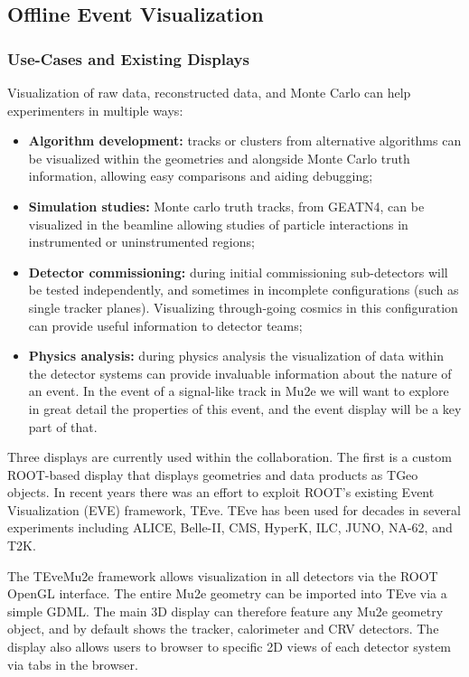 \subsection{Offline Event Visualization}

\subsubsection{Use-Cases and Existing Displays}
Visualization of raw data, reconstructed data, and Monte Carlo can help experimenters in multiple ways:
\begin{itemize}
    \item \textbf{Algorithm development:} tracks or clusters from alternative algorithms can be visualized within the geometries and alongside Monte Carlo truth information, allowing easy comparisons and aiding debugging;
    \item \textbf{Simulation studies:} Monte carlo truth tracks, from GEATN4, can be visualized in the beamline allowing studies of particle interactions in instrumented or uninstrumented regions;
    \item \textbf{Detector commissioning:} during initial commissioning sub-detectors will be tested independently, and sometimes in incomplete configurations (such as single tracker planes). Visualizing through-going cosmics in this configuration can provide useful information to detector teams;
    \item \textbf{Physics analysis:} during physics analysis the visualization of data within the detector systems can provide invaluable information about the nature of an event. In the event of a signal-like track in Mu2e we will want to explore in great detail the properties of this event, and the event display will be a key part of that.
\end{itemize}

 Three displays are currently used within the collaboration. The first is a custom ROOT-based display that displays geometries and data products as TGeo objects. In recent years there was an effort to exploit ROOT's existing Event Visualization (EVE) framework, TEve. TEve has been used for decades in several experiments including ALICE, Belle-II, CMS, HyperK, ILC, JUNO, NA-62, and T2K. 
 
 The TEveMu2e framework allows visualization in all detectors via the ROOT OpenGL interface. The entire Mu2e geometry can be imported into TEve via a simple GDML. The main 3D display can therefore feature any Mu2e geometry object, and by default shows the tracker, calorimeter and CRV detectors. The display also allows users to browser to specific 2D views of each detector system via tabs in the browser. 

